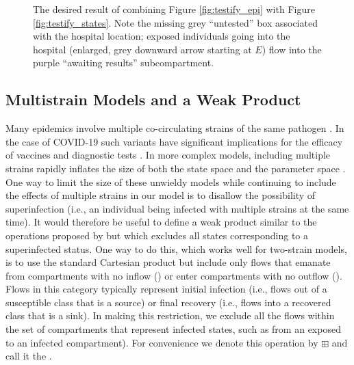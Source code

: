 \begin{figure}
    \centering
    
    \caption{The desired result of combining Figure \ref{fig:testify_epi} with Figure \ref{fig:testify_states}. Note the missing grey ``untested'' box associated with the hospital location; exposed individuals going into the hospital (enlarged, grey downward arrow starting at $E$) flow into the purple ``awaiting results'' subcompartment.}
    \label{fig:testify_desired}
\end{figure}

\FloatBarrier


\subsection{Multistrain Models and a Weak Product}\label{wp}

Many epidemics involve multiple co-circulating strains of the same pathogen \citep{gog2002dynamics, williams2021localization}. In the case of COVID-19 such variants have significant implications for the efficacy of vaccines \citep{abu2021effectiveness, koyama2020emergence} and diagnostic tests \citep{vasireddy2021review}. In more complex models, including multiple strains rapidly inflates the size of both the state space and the parameter space \citep{kryazhimskiy2007state}. One way to limit the size of these unwieldy models while continuing to include the effects of multiple strains in our model is to disallow the possibility of superinfection (i.e., an individual being infected with multiple strains at the same time).  It would therefore be useful to define a weak product similar to the operations proposed by \cite{worden2017products} but which excludes all states corresponding to a superinfected status. One way to do this, which works well for two-strain models, is to use the standard Cartesian product but include only flows that emanate from compartments with no inflow () or enter compartments with no outflow (). Flows in this category typically represent initial infection (i.e., flows out of a susceptible class that is a source) or final recovery (i.e., flows into a recovered class that is a sink). In making this restriction, we exclude all the flows within the set of compartments that represent infected states, such as from an exposed to an infected compartment).
For convenience we denote this operation by $\boxplus$ and call it the .


